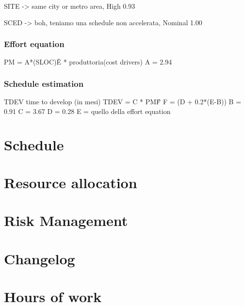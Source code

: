 \documentclass[english]{article}
\begin{document}
SITE -> same city or metro area, High 0.93

SCED -> boh, teniamo una schedule non accelerata, Nominal 1.00

\subsubsection{Effort equation}


PM = A*(SLOC)\^E * produttoria(cost drivers)
A = 2.94



\subsubsection{Schedule estimation}

TDEV time to develop (in mesi)
TDEV = C * PM\^F
F = (D + 0.2*(E-B))
B = 0.91
C = 3.67
D = 0.28
E = quello della effort equation


\section{Schedule}


\section{Resource allocation}


\section{Risk Management}

\appendix

\section{Changelog}

\section{Hours of work}
\end{document}
